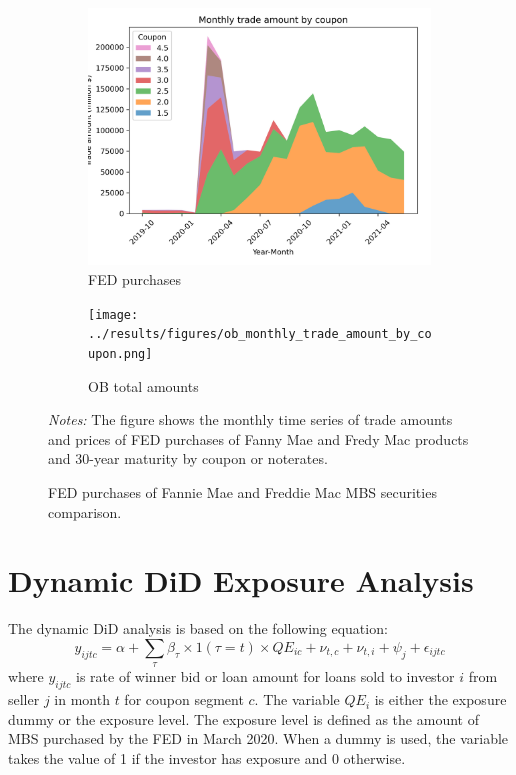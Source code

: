 \documentclass[11pt,a4paper]{article}
\begin{document}
\begin{figure}[h]
  \centering
  \begin{subfigure}[b]{0.75\textwidth}
    \includegraphics[width=0.998\textwidth]{../results/figures/fed_monthly_trade_amount_by_coupon.png}
    \caption{FED purchases}
   \end{subfigure}
   \begin{subfigure}[b]{0.75\textwidth}
    \texttt{[image: ../results/figures/ob\_monthly\_trade\_amount\_by\_coupon.png]}
    \caption{OB total amounts}
   \end{subfigure}
   \caption{FED purchases of Fannie Mae and Freddie Mac MBS securities comparison.} 
   \begin{minipage}{\textwidth}
    \footnotesize{\textit{Notes:} The figure shows the monthly time series of trade amounts and prices of FED purchases of Fanny Mae and Fredy Mac products and 30-year maturity by coupon or noterates. } 
      \end{minipage}
\end{figure}


\pagebreak
\section{Dynamic DiD Exposure Analysis}

The dynamic DiD analysis is based on the following equation:
$$y_{ijtc} = \alpha + \sum_\tau \beta_\tau \times 1({\tau}=t)  \times QE_{ic} + \nu_{t,c} + \nu_{t,i} +\psi_{j} + \epsilon_{ijtc}$$
where $y_{ijtc}$ is rate of winner bid or loan amount for loans sold to investor $i$ from seller $j$ in month $t$ for coupon segment $c$. The variable $QE_{i}$ is either the exposure dummy or the exposure level. The exposure level is defined as the amount of MBS purchased by the FED in March 2020. When a dummy is used, the variable takes the value of 1 if the investor has exposure and 0 otherwise. 
\end{document}
